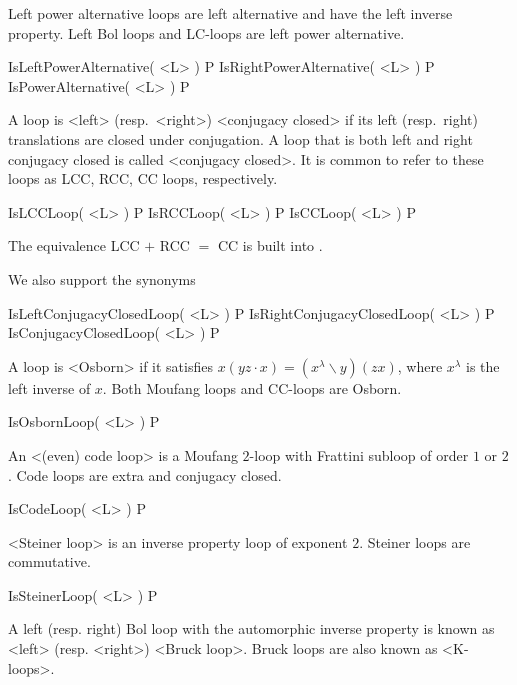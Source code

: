 Left power alternative loops are left alternative and have the
left inverse property. Left Bol loops and LC-loops are left power
alternative.

\>IsLeftPowerAlternative( <L> ) P
\>IsRightPowerAlternative( <L> ) P
\>IsPowerAlternative( <L> ) P


\noindent A loop is <left> (resp.\ <right>) <conjugacy closed> if its left (resp.\ right)
translations are closed under conjugation. A loop that is both left and right
conjugacy closed is called <conjugacy closed>. It is common to refer to these loops as
LCC, RCC, CC loops, respectively.

\>IsLCCLoop( <L> ) P
\>IsRCCLoop( <L> ) P
\>IsCCLoop( <L> ) P

The equivalence LCC $+$ RCC $=$ CC is built into {\LOOPS}.

We also support the synonyms

\>IsLeftConjugacyClosedLoop( <L> ) P
\>IsRightConjugacyClosedLoop( <L> ) P
\>IsConjugacyClosedLoop( <L> ) P

A loop is <Osborn> if it satisfies
$x(yz\cdot x)=(x^\lambda\backslash y)(zx)$, where $x^\lambda$ is the left
inverse of $x$. Both Moufang loops and CC-loops are Osborn.

\>IsOsbornLoop( <L> ) P


An <(even) code loop> is a Moufang $2$-loop
with Frattini subloop of order $1$ or $2$. Code loops are extra and conjugacy
closed.

\>IsCodeLoop( <L> ) P

<Steiner loop> is an inverse property
loop of exponent $2$. Steiner loops are commutative.

\>IsSteinerLoop( <L> ) P

A left (resp. right) Bol loop with the automorphic inverse property is known as
<left> (resp. <right>) <Bruck loop>. Bruck loops are also known as
<K-loops>.

